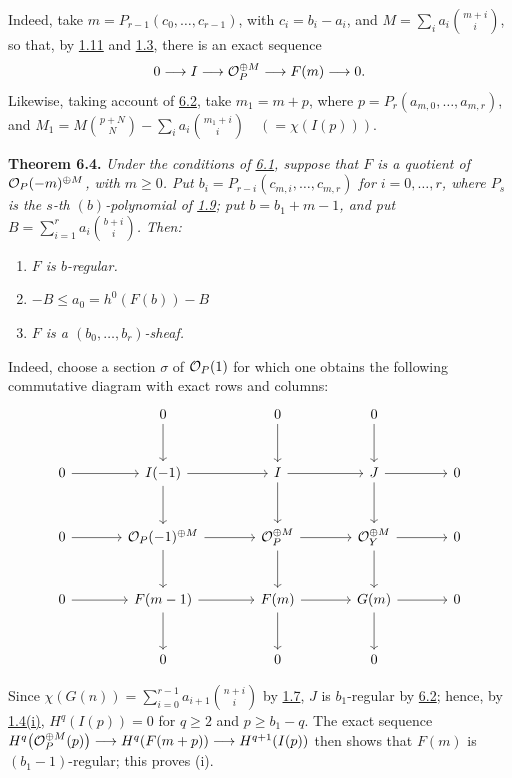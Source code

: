 Indeed, take $m=P_{r-1}(c_0,\ldots,c_{r-1})$, with $c_i=b_i-a_i$,
and $M=\sum_i a_i\binom{m+i}{i}$, so that, by \hyperlink{sga6.e13.thm.1-11}{1.11} and \hyperlink{sga6.e13.prop.1-3}{1.3}, there is
an exact sequence
\[
  0\longrightarrow I\longrightarrow\mathcal O_P^{\oplus M}
  \longrightarrow F(m)\longrightarrow0.
\]
Likewise, taking account of \hyperlink{sga6.e13.lem.6-2}{6.2}, take $m_1=m+p$, where
$p=P_r(a_{m,0},\ldots,a_{m,r})$, and
$M_1=M\binom{p+N}{N}-\sum_i a_i\binom{m_1+i}{i}
\quad(=\chi(I(p)))$.

\textbf{Theorem 6.4.} \emph{Under the conditions of \hyperlink{sga6.e13.para.6-1}{6.1}, suppose that
$F$ is a quotient of $\mathcal O_P(-m)^{\oplus M}$, with $m\geq0$. Put
$b_i=P_{r-i}(c_{m,i},\ldots,c_{m,r})$ for $i=0,\ldots,r$, where $P_s$
is the $s$-th $(b)$-polynomial of \hyperlink{sga6.e13.def.1-9}{1.9}; put $b=b_1+m-1$, and put
$B=\sum_{i=1}^{r}a_i\binom{b+i}{i}$. Then:}
\begin{enumerate}[label=(\roman*)]
\item \emph{$F$ is $b$-regular.}
\item \emph{$-B\leq a_0=h^0(F(b))-B$}
\item \emph{$F$ is a $(b_0,\ldots,b_r)$-sheaf.}
\end{enumerate}

Indeed, choose a section $\sigma$ of $\mathcal O_P(1)$ for which one obtains the following commutative diagram with exact rows and columns:
\[
\begin{tikzcd}[column sep=large,row sep=large]
&0 \arrow[d]&0 \arrow[d]&0 \arrow[d]&\\
0 \arrow[r]&I(-1) \arrow[r] \arrow[d]&I \arrow[r] \arrow[d]&J \arrow[r] \arrow[d]&0\\
0 \arrow[r]&\cO_P(-1)^{\oplus M} \arrow[r] \arrow[d]&\cO_P^{\oplus M} \arrow[r] \arrow[d]&\cO_Y^{\oplus M} \arrow[r] \arrow[d]&0\\
0 \arrow[r]&F(m-1) \arrow[r] \arrow[d]&F(m) \arrow[r] \arrow[d]&G(m) \arrow[r] \arrow[d]&0\\
&0&0&0&
\end{tikzcd}
\]

Since $\chi(G(n))=\sum_{i=0}^{r-1}a_{i+1}\binom{n+i}{i}$ by \hyperlink{sga6.e13.lem.1-7}{1.7},
$J$ is $b_1$-regular by \hyperlink{sga6.e13.lem.6-2}{6.2}; hence, by \hyperlink{sga6.e13.prop.1-4}{1.4(i)}, $H^q(I(p))=0$ for
$q\geq2$ and $p\geq b_1-q$. The exact sequence
$H^q\bigl(\mathcal O_P^{\oplus M}(p)\bigr)\longrightarrow
H^q(F(m+p))\longrightarrow H^{q+1}(I(p))$ then shows that $F(m)$ is
$(b_1-1)$-regular; this proves (i).

